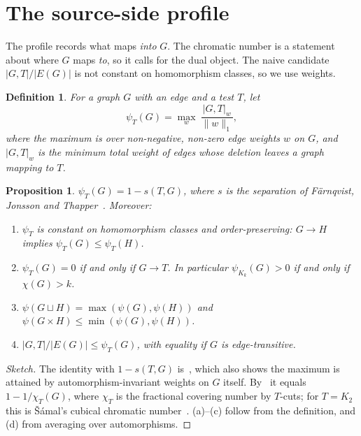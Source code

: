 \documentclass{article}
\newtheorem{proposition}[theorem]{Proposition}
\newtheorem{definition}[theorem]{Definition}
\begin{document}
\section{The source-side profile}

The profile records what maps \emph{into} $G$.  The chromatic number is a
statement about where $G$ maps \emph{to}, so it calls for the dual object.
The naive candidate $|G,T|/|E(G)|$ is not constant on homomorphism classes,
so we use weights.

\begin{definition}
For a graph $G$ with an edge and a test $T$, let
\[
  \psi_T(G)=\max_{w}\ \frac{|G,T|_w}{\|w\|_1},
\]
where the maximum is over non-negative, non-zero edge weights $w$ on $G$,
and $|G,T|_w$ is the minimum total weight of edges whose deletion leaves a
graph mapping to $T$.
\end{definition}

\begin{proposition}
\label{prop:psi}
$\psi_T(G)=1-s(T,G)$, where $s$ is the separation of
F\"arnqvist, Jonsson and Thapper~\cite{fjt2009,efjt2015}.  Moreover:
\begin{enumerate}
\item[(a)] $\psi_T$ is constant on homomorphism classes and order-preserving:
           $G\to H$ implies $\psi_T(G)\le\psi_T(H)$.
\item[(b)] $\psi_T(G)=0$ if and only if $G\to T$.  In particular
           $\psi_{K_k}(G)>0$ if and only if $\chi(G)>k$.
\item[(c)] $\psi(G\sqcup H)=\max(\psi(G),\psi(H))$ and
           $\psi(G\times H)\le\min(\psi(G),\psi(H))$.
\item[(d)] $|G,T|/|E(G)|\le\psi_T(G)$, with equality if $G$ is edge-transitive.
\end{enumerate}
\end{proposition}

\begin{proof}[Sketch]
The identity with $1-s(T,G)$ is~\cite[Thm.~2.1, Cor.~2.11]{efjt2015}, which
also shows the maximum is attained by automorphism-invariant weights on $G$
itself.  By~\cite[Prop.~5.4]{efjt2015} it equals $1-1/\chi_T(G)$, where
$\chi_T$ is the fractional covering number by $T$-cuts; for $T=K_2$ this is
\v{S}\'amal's cubical chromatic number~\cite{samal2015}.  (a)--(c) follow
from the definition, and (d) from averaging over automorphisms.
\end{proof}
\end{document}

